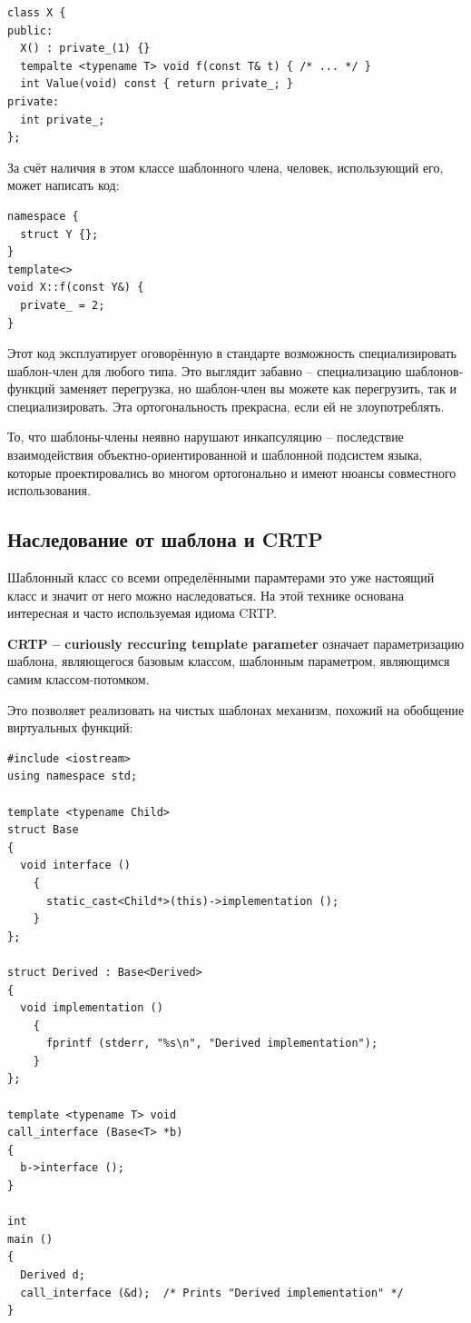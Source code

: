 \documentclass[a4paper,12pt,oneside]{article}
\begin{document}
\begin{lstlisting}
class X {
public:
  X() : private_(1) {}
  tempalte <typename T> void f(const T& t) { /* ... */ }
  int Value(void) const { return private_; }
private:
  int private_;  
};
\end{lstlisting}

За счёт наличия в этом классе шаблонного члена, человек, использующий его, может написать код:

\begin{lstlisting}
namespace {
  struct Y {};
}
template<>
void X::f(const Y&) {
  private_ = 2;
}
\end{lstlisting}

Этот код эксплуатирует оговорённую в стандарте возможность специализировать шаблон-член для любого типа. Это выглядит забавно -- специализацию шаблонов-функций заменяет перегрузка, но шаблон-член вы можете как перегрузить, так и специализировать. Эта ортогональность прекрасна, если ей не злоупотреблять.

То, что шаблоны-члены неявно нарушают инкапсуляцию -- последствие взаимодействия объектно-ориентированной и шаблонной подсистем языка, которые проектировались во многом ортогонально и имеют нюансы совместного использования.

\subsection{Наследование от шаблона и CRTP}

Шаблонный класс со всеми определёнными парамтерами это уже настоящий класс и значит от него можно наследоваться. На этой технике основана интересная и часто используемая идиома CRTP.

\textbf{CRTP – curiously reccuring template parameter} означает параметризацию шаблона, являющегося базовым классом, шаблонным параметром, являющимся самим классом-потомком. 

Это позволяет реализовать на чистых шаблонах механизм, похожий на обобщение виртуальных функций:

\begin{lstlisting}
#include <iostream>
using namespace std;

template <typename Child>
struct Base
{
  void interface ()
    {
      static_cast<Child*>(this)->implementation ();
    }
};

struct Derived : Base<Derived>
{
  void implementation ()
    {
      fprintf (stderr, "%s\n", "Derived implementation");
    }
};

template <typename T> void
call_interface (Base<T> *b)
{
  b->interface ();
}

int 
main ()
{
  Derived d;
  call_interface (&d);  /* Prints "Derived implementation" */
}
\end{lstlisting}
\end{document}
